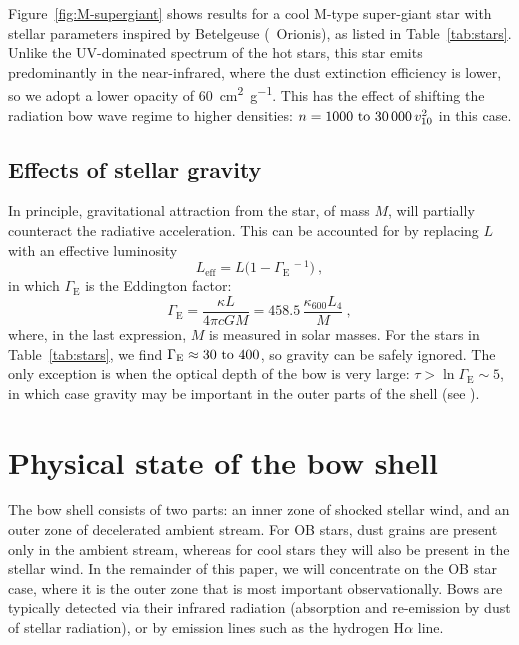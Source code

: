 Figure~\ref{fig:M-supergiant} shows results for a cool M-type
super-giant star with stellar parameters inspired by Betelgeuse
(\chemalpha~Orionis), as listed in Table~\ref{tab:stars}.  Unlike the
UV-dominated spectrum of the hot stars, this star emits predominantly
in the near-infrared, where the dust extinction efficiency is lower,
so we adopt a lower opacity of \SI{60}{cm^2.g^{-1}}.  This has the
effect of shifting the radiation bow wave regime to higher densities:
\(n = \text{\numrange{1000}{30 000}}\, v_{10}^2\) in this case.


\subsection{Effects of stellar gravity}
\label{sec:effects-gravity}

In principle, gravitational attraction from the star, of mass \(M\),
will partially counteract the radiative acceleration.  This can be
accounted for by replacing \(L\) with an effective luminosity
\newcommand\Edd{\ensuremath{_{\text{E}}}}
\begin{equation}
  \label{eq:effective-luminosity}
  L_{\text{eff}} = L \bigl(1 - \Gamma\Edd^{\,-1}\bigr) \ ,
\end{equation}
in which \(\Gamma\Edd\) is the Eddington factor:
\begin{equation}
  \label{eq:eddington-factor}
  \Gamma\Edd = \frac{\kappa L}{4\pi c G M} = 458.5 \, \frac{\kappa_{600} L_4}{ M } \ ,
\end{equation}
where, in the last expression, \(M\) is measured in solar masses.  For
the stars in Table~\ref{tab:stars}, we find
\(\Gamma\Edd \approx \text{\numrange{30}{400}}\), so gravity can be safely
ignored.  The only exception is when the optical depth of the bow is
very large: \(\tau > \ln\Gamma\Edd \sim 5\), in which case gravity may be
important in the outer parts of the shell (see
\citealt{Rodriguez-Ramirez:2016b}).


\section{Physical state of the bow shell}
\label{sec:phys-state-shock}

The bow shell consists of two parts: an inner zone of shocked stellar
wind, and an outer zone of decelerated ambient stream. For OB stars,
dust grains are present only in the ambient stream, whereas for cool
stars they will also be present in the stellar wind.  In the remainder
of this paper, we will concentrate on the OB star case, where it is
the outer zone that is most important observationally.  Bows are
typically detected via their infrared radiation (absorption and
re-emission by dust of stellar radiation), or by emission lines such
as the hydrogen H\(\alpha\) line.

